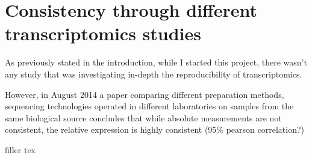 \clearpage
\chapter{Consistency through different transcriptomics studies}
\label{sec:Transcriptomics}

As previously stated in the introduction, while I started this project,
there wasn't any study that was investigating in-depth the reproducibility of
transcriptomics.

\begin{comment}
Should the following go to the intro?
\end{comment}

However, in August 2014 a paper comparing different preparation methods,
sequencing technologies operated in different laboratories
on samples from the same biological source concludes that while absolute
measurements are not consistent, the relative expression is highly consistent
(95\% pearson correlation?)


filler tex\cite{schwanhausserglobal:2011}


